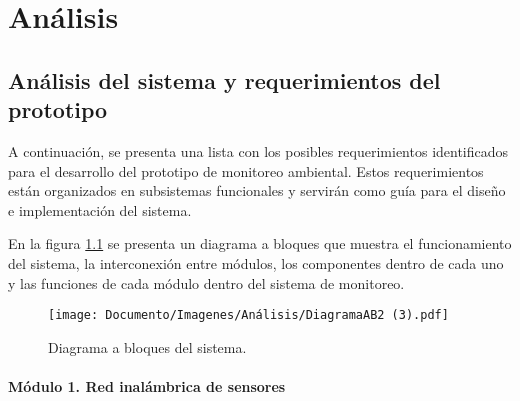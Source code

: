 \chapter{Análisis}

\section{Análisis del sistema y requerimientos del prototipo}

A continuación, se presenta una lista con los posibles requerimientos identificados para el desarrollo del prototipo de monitoreo ambiental. Estos requerimientos están organizados en subsistemas funcionales y servirán como guía para el diseño e implementación del sistema.


En la figura \ref{Dig:diagramaAB} se presenta un diagrama a bloques que muestra el funcionamiento del sistema, la interconexión entre módulos, los componentes dentro de cada uno y las funciones de cada módulo dentro del sistema de monitoreo.

\begin{figure}[H]
    \centering
    \texttt{[image: Documento/Imagenes/Análisis/DiagramaAB2 (3).pdf]}
    \caption{Diagrama a bloques del sistema.}
    \label{Dig:diagramaAB}
\end{figure}
   

\subsubsection*{Módulo 1. Red inalámbrica de sensores}

